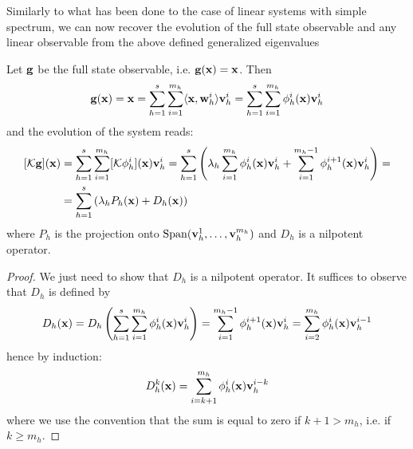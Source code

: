 Similarly to what has been done to the case of linear systems with simple spectrum, we can now recover the evolution of the full state observable and any linear observable from the above defined generalized eigenvalues
\begin{prop}
\label{prop_decomposition_jordan}
Let $\vb{g}$ be the full state observable, i.e. $\vb{g}(\vb{x}) = \vb{x}$. Then
\begin{equation*}
    \vb{g}(\vb{x}) = \vb{x} = \sum_{h = 1}^{s}\sum_{i = 1}^{m_h}\langle \vb{x}, \vb{w}_h^i\rangle\vb{v}_h^i = \sum_{h = 1}^{s}\sum_{i = 1}^{m_h} \phi_h^i(\vb{x}) \vb{v}_h^i
\end{equation*}
and the evolution of the system reads:
\begin{equation}
\begin{split}
    [\mathcal{K}\vb{g}](\vb{x}) &= \sum_{h = 1}^{s}\sum_{i = 1}^{m_h} [\mathcal{K}\phi_h^i](\vb{x}) \vb{v}_h^i = \sum_{h = 1}^{s} \left(\lambda_h\sum_{i = 1}^{m_h} \phi_h^i(\vb{x})\vb{v}_h^i + \sum_{i = 1}^{m_h-1}\phi_h^{i+1}(\vb{x})\vb{v}_h^i \right) =\\
    &= \sum_{h = 1}^{s} \left(\lambda_h P_h(\vb{x}) + D_h(\vb{x}) \right)
\end{split}
\end{equation}
where $P_h$ is the projection onto $\mathrm{Span}(\vb{v}_h^1,\dots,\vb{v}_h^{m_h})$ and $D_h$ is a nilpotent operator.
\end{prop}
\begin{proof}
We just need to show that $D_h$ is a nilpotent operator. It suffices to observe that $D_h$ is defined by
\begin{equation}
    D_h(\vb{x}) = D_h\left(\sum_{h = 1}^{s}\sum_{i = 1}^{m_h} \phi_h^i(\vb{x}) \vb{v}_h^i\right) = \sum_{i = 1}^{m_h-1}\phi_h^{i+1}(\vb{x})\vb{v}_h^i = \sum_{i = 2}^{m_h}\phi_h^{i}(\vb{x})\vb{v}_h^{i-1}
\end{equation}
hence by induction:
\begin{equation}
    D_h^k(\vb{x}) = \sum_{i = k+1}^{m_h}\phi_h^{i}(\vb{x})\vb{v}_h^{i-k}
\end{equation}
where we use the convention that the sum is equal to zero if $k+1>m_h$, i.e. if $k \geq m_h$.
\end{proof}

